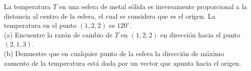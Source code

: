 \item La temperatura $T$ en una esfera de metal sólida es inversamente proporcional a la distancia al centro de la esfera, el cual se considera que es el origen. La temperatura en el punto $(1, 2, 2)$ es $120^\circ$. \\
(a) Encuentre la razón de cambio de $T$ en $(1, 2, 2)$ en dirección hacia el punto $(2, 1, 3)$. \\
(b) Demuestre que en cualquier punto de la esfera la dirección de máximo aumento de la temperatura está dada por un vector que apunta hacia el origen.
